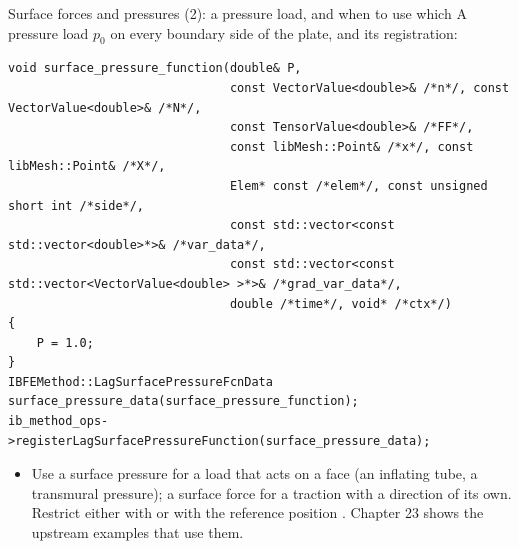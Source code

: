 \documentclass[aspectratio=169,11pt]{beamer}
\begin{document}
\begin{frame}[fragile]{Surface forces and pressures (2): a pressure load, and when to use which}
\label{fr:surface2}
\footnotesize
A pressure load $p_0$ on every boundary side of the plate, and its registration:
\begin{lstlisting}[style=cpptiny]
void surface_pressure_function(double& P,
                               const VectorValue<double>& /*n*/, const VectorValue<double>& /*N*/,
                               const TensorValue<double>& /*FF*/,
                               const libMesh::Point& /*x*/, const libMesh::Point& /*X*/,
                               Elem* const /*elem*/, const unsigned short int /*side*/,
                               const std::vector<const std::vector<double>*>& /*var_data*/,
                               const std::vector<const std::vector<VectorValue<double> >*>& /*grad_var_data*/,
                               double /*time*/, void* /*ctx*/)
{
    P = 1.0;
}
IBFEMethod::LagSurfacePressureFcnData surface_pressure_data(surface_pressure_function);
ib_method_ops->registerLagSurfacePressureFunction(surface_pressure_data);
\end{lstlisting}
\begin{itemize}
  \item Use a surface pressure for a load that acts on a face (an inflating tube, a transmural pressure); a surface force for a traction with a direction of its own. Restrict either with  or with the reference position . Chapter 23 shows the upstream examples that use them.
\end{itemize}
\end{frame}
\end{document}
